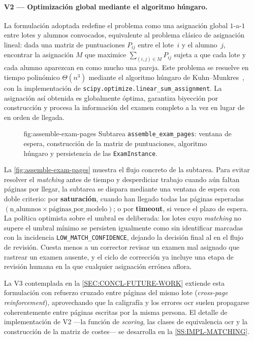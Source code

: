 \paragraph{V2 — Optimización global mediante el algoritmo húngaro.}
La formulación adoptada redefine el problema como una asignación global
\(1\)-a-\(1\) entre lotes y alumnos convocados, equivalente al problema
clásico de asignación lineal: dada una matriz de puntuaciones \(P_{ij}\)
entre el lote~\(i\) y el alumno~\(j\), encontrar la asignación \(M\)
que maximice
\(\sum_{(i,j)\in M} P_{ij}\) sujeta a que cada lote y cada alumno
aparezcan en como mucho una pareja. Este problema se resuelve en tiempo
polinómico \(\Theta(n^{3})\) mediante el algoritmo húngaro de
Kuhn--Munkres~\cite{kuhn1955hungarian}, con la implementación de
\texttt{scipy.optimize.linear\_sum\_assignment}. La asignación así
obtenida es globalmente óptima, garantiza biyección por construcción y
procesa la información del examen completo a la vez en lugar de en
orden de llegada.

\begin{figure}[Subtarea de ensamblado y matching]%
              {fig:assemble-exam-pages}%
              {Subtarea \texttt{assemble\_exam\_pages}: ventana de
               espera, construcción de la matriz de puntuaciones,
               algoritmo húngaro y persistencia de las
               \texttt{ExamInstance}.}
\end{figure}

La \cref{fig:assemble-exam-pages} muestra el flujo concreto de la
subtarea. Para evitar resolver el \textit{matching} antes de tiempo y
desperdiciar trabajo cuando aún faltan páginas por llegar, la subtarea
se dispara mediante una ventana de espera con doble criterio: por
\textbf{saturación}, cuando han llegado todas las páginas esperadas
\((\text{n\_alumnos}\times\text{páginas\_por\_modelo})\); o por
\textbf{timeout}, si vence el plazo de espera. La política optimista
sobre el umbral es deliberada: los lotes cuyo \textit{matching} no
supere el umbral mínimo se persisten igualmente como
 sin identificar marcadas con la incidencia
\texttt{LOW\_MATCH\_CONFIDENCE}, dejando la decisión final al
 en el flujo de revisión. Cuesta menos a un corrector
revisar un examen mal asignado que rastrear un examen ausente, y el
ciclo de corrección ya incluye una etapa de revisión humana en la que
cualquier asignación errónea aflora.

La V3 contemplada en la \cref{SEC:CONCL-FUTURE-WORK} extiende esta
formulación con refuerzo cruzado entre páginas del mismo lote
(\textit{cross-page reinforcement}), aprovechando que la caligrafía y
los errores \acs{ocr} suelen propagarse coherentemente entre páginas
escritas por la misma persona. El detalle de implementación de V2 —la
función de \textit{scoring}, las clases de equivalencia \acs{ocr} y la
construcción de la matriz de costes— se desarrolla en la
\cref{SS:IMPL-MATCHING}.
